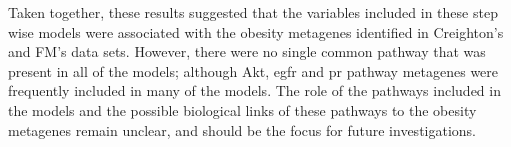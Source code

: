 Taken together, these results suggested that the variables included in these step wise models were associated with the obesity metagenes identified in Creighton's and FM's data sets.
However, there were no single common pathway that was present in all of the models; although Akt, \gls{egfr} and \gls{pr} pathway metagenes were frequently included in many of the models.
The role of the pathways included in the models and the possible biological links of these pathways to the obesity metagenes remain unclear, and should be the focus for future investigations.

